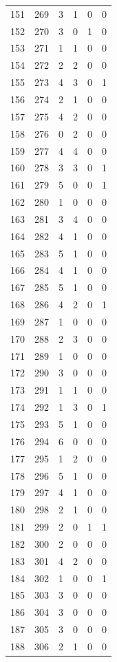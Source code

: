 \documentclass[
  letterpaper,
  DIV=11,
  numbers=noendperiod]{scrreprt}
\begin{document}
\begin{longtable}[]{@{}rrrrrr@{}}
151 & 269 & 3 & 1 & 0 & 0 \\
152 & 270 & 3 & 0 & 1 & 0 \\
153 & 271 & 1 & 1 & 0 & 0 \\
154 & 272 & 2 & 2 & 0 & 0 \\
155 & 273 & 4 & 3 & 0 & 1 \\
156 & 274 & 2 & 1 & 0 & 0 \\
157 & 275 & 4 & 2 & 0 & 0 \\
158 & 276 & 0 & 2 & 0 & 0 \\
159 & 277 & 4 & 4 & 0 & 0 \\
160 & 278 & 3 & 3 & 0 & 1 \\
161 & 279 & 5 & 0 & 0 & 1 \\
162 & 280 & 1 & 0 & 0 & 0 \\
163 & 281 & 3 & 4 & 0 & 0 \\
164 & 282 & 4 & 1 & 0 & 0 \\
165 & 283 & 5 & 1 & 0 & 0 \\
166 & 284 & 4 & 1 & 0 & 0 \\
167 & 285 & 5 & 1 & 0 & 0 \\
168 & 286 & 4 & 2 & 0 & 1 \\
169 & 287 & 1 & 0 & 0 & 0 \\
170 & 288 & 2 & 3 & 0 & 0 \\
171 & 289 & 1 & 0 & 0 & 0 \\
172 & 290 & 3 & 0 & 0 & 0 \\
173 & 291 & 1 & 1 & 0 & 0 \\
174 & 292 & 1 & 3 & 0 & 1 \\
175 & 293 & 5 & 1 & 0 & 0 \\
176 & 294 & 6 & 0 & 0 & 0 \\
177 & 295 & 1 & 2 & 0 & 0 \\
178 & 296 & 5 & 1 & 0 & 0 \\
179 & 297 & 4 & 1 & 0 & 0 \\
180 & 298 & 2 & 1 & 0 & 0 \\
181 & 299 & 2 & 0 & 1 & 1 \\
182 & 300 & 2 & 0 & 0 & 0 \\
183 & 301 & 4 & 2 & 0 & 0 \\
184 & 302 & 1 & 0 & 0 & 1 \\
185 & 303 & 3 & 0 & 0 & 0 \\
186 & 304 & 3 & 0 & 0 & 0 \\
187 & 305 & 3 & 0 & 0 & 0 \\
188 & 306 & 2 & 1 & 0 & 0 \\

\end{longtable}
\end{document}
